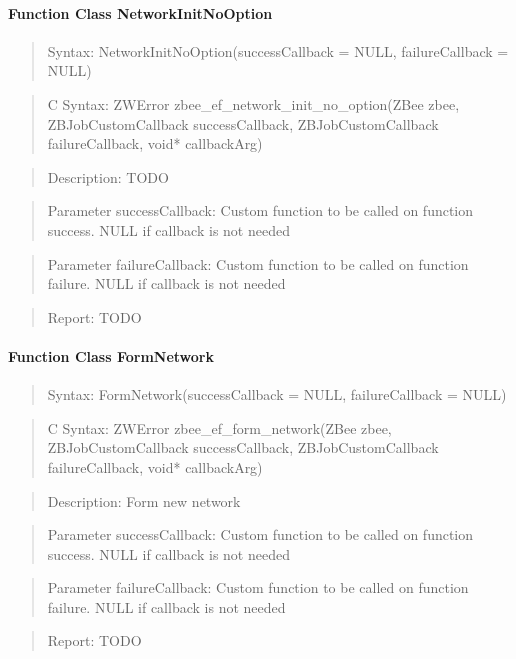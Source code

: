 \paragraph{Function Class NetworkInitNoOption}
\begin{quote}Syntax: NetworkInitNoOption(successCallback = NULL, failureCallback = NULL)\end{quote}
\begin{quote}C Syntax: ZWError zbee\_ef\_network\_init\_no\_option(ZBee zbee, ZBJobCustomCallback successCallback, ZBJobCustomCallback failureCallback, void* callbackArg)\end{quote}
\begin{quote}Description: TODO\end{quote}
\begin{quote}Parameter successCallback: Custom function to be called on function success. NULL if callback is not needed\end{quote}
\begin{quote}Parameter failureCallback: Custom function to be called on function failure. NULL if callback is not needed\end{quote}
\begin{quote}Report: TODO\end{quote}

\paragraph{Function Class FormNetwork}
\begin{quote}Syntax: FormNetwork(successCallback = NULL, failureCallback = NULL)\end{quote}
\begin{quote}C Syntax: ZWError zbee\_ef\_form\_network(ZBee zbee, ZBJobCustomCallback successCallback, ZBJobCustomCallback failureCallback, void* callbackArg)\end{quote}
\begin{quote}Description: Form new network\end{quote}
\begin{quote}Parameter successCallback: Custom function to be called on function success. NULL if callback is not needed\end{quote}
\begin{quote}Parameter failureCallback: Custom function to be called on function failure. NULL if callback is not needed\end{quote}
\begin{quote}Report: TODO\end{quote}


